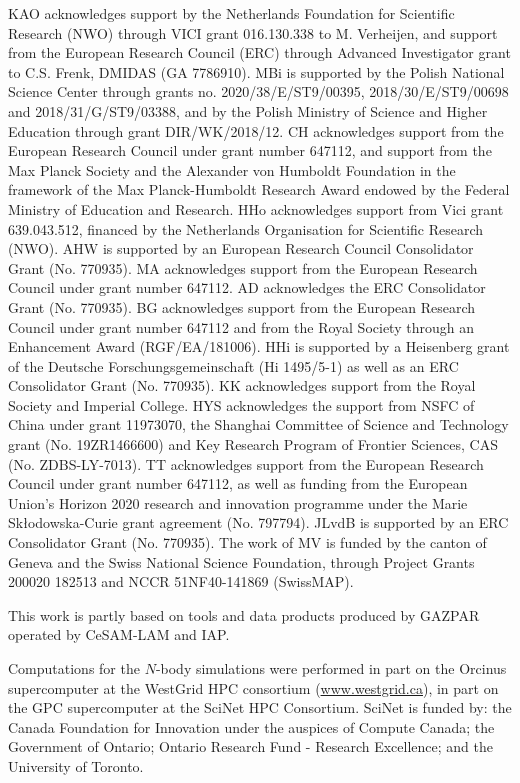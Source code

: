 \documentclass{aa}
\begin{document}
KAO acknowledges support by the Netherlands Foundation for Scientific Research (NWO) through VICI grant 016.130.338 to M. Verheijen, and support from the European Research Council (ERC) through Advanced Investigator grant to C.S. Frenk, DMIDAS (GA 7786910). MBi is supported by the Polish National Science Center through grants no. 2020/38/E/ST9/00395, 2018/30/E/ST9/00698 and 2018/31/G/ST9/03388, and by the Polish Ministry of Science and Higher Education through grant DIR/WK/2018/12. CH acknowledges support from the European Research Council under grant number 647112, and support from the Max Planck Society and the Alexander von Humboldt Foundation in the framework of the Max Planck-Humboldt Research Award endowed by the Federal Ministry of Education and Research. HHo acknowledges support from Vici grant 639.043.512, financed by the Netherlands Organisation for Scientific Research (NWO). AHW is supported by an European Research Council Consolidator Grant (No. 770935). MA acknowledges support from the European Research Council under grant number 647112. AD acknowledges the ERC Consolidator Grant (No. 770935). BG acknowledges support from the European Research Council under grant number 647112 and from the Royal Society through an Enhancement Award (RGF/EA/181006). HHi is supported by a Heisenberg grant of the Deutsche Forschungsgemeinschaft (Hi 1495/5-1) as well as an ERC Consolidator Grant (No. 770935). KK acknowledges support from the Royal Society and Imperial College. HYS acknowledges the support from NSFC of China under grant 11973070, the Shanghai Committee of Science and Technology grant (No. 19ZR1466600) and Key Research Program of Frontier Sciences, CAS (No. ZDBS-LY-7013). TT acknowledges support from the European Research Council under grant number 647112, as well as funding from the European Union's Horizon 2020 research and innovation programme under the Marie Sk\l{}odowska-Curie grant agreement (No. 797794). JLvdB is supported by an ERC Consolidator Grant (No. 770935). The work of MV is funded by the canton of Geneva and the Swiss National Science Foundation, through Project Grants 200020 182513 and NCCR 51NF40-141869 (SwissMAP).

This work is partly based on tools and data products produced by GAZPAR operated by CeSAM-LAM and IAP.

Computations for the $N$-body simulations were performed in part on the Orcinus supercomputer at the WestGrid HPC consortium (\url{www.westgrid.ca}), in part on the GPC supercomputer at the SciNet HPC Consortium. SciNet is funded by: the Canada Foundation for Innovation under the auspices of Compute Canada; the Government of Ontario; Ontario Research Fund - Research Excellence; and the University of Toronto.
\end{document}
